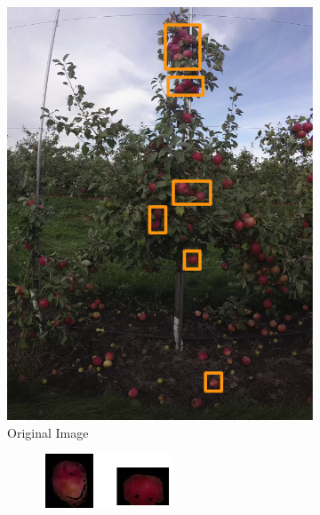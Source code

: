\begin{figure}[tbp]
        \centering
        \begin{subfigure}[b]{.3\textwidth}
        \centering
            \includegraphics[width = \textwidth]{figures/counting/original}           
         \caption{Original Image}
         \label{fig:singorig}
       \end{subfigure}\quad \begin{subfigure}[b]{.3\textwidth}
       \begin{subfigure}[b]{\textwidth}
            \includegraphics[width = \textwidth]{figures/counting/sapple1}           

\end{subfigure}
\end{subfigure}
\end{figure}

